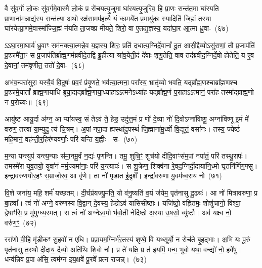 वै सु॑व॒र्गो लो॒कः सु॑व॒र्गमे॒वास्मै॑ लो॒कं प्र रो॑चयत्यृ॒जुमा घा॑रयत्यृ॒जुरि॑व॒ हि प्रा॒णः सन्त॑त॒मा घा॑रयति प्रा॒णाना॑म॒न्नाद्य॑स्य॒ सन्त॑त्या॒ अथो॒ रक्ष॑सा॒मप॑हत्यै॒ यं का॒मये॑त प्र॒मायु॑कः स्या॒दिति॑ जि॒ह्मं तस्या घा॑रयेत्प्रा॒णमे॒वास्मा᳚ज्जि॒ह्मं न॑यति ता॒जक्प्र मी॑यते॒ शिरो॒ वा ए॒तद्य॒ज्ञस्य॒ यदा॑घा॒र आ॒त्मा ध्रु॒वा-~(६७)\ip

ऽ\-ऽघा॒रमा॒घार्य॑ ध्रु॒वाꣳ सम॑नक्त्या॒त्मन्ने॒व य॒ज्ञस्य॒ शिरः॒ प्रति॑ दधा\-त्य॒\-ग्निर्दे॒वानां᳚ दू॒त आसी॒द्दैव्यो\-ऽसु॑राणां॒ तौ प्र॒जा\-प॑तिं प्र॒श्ञमै॑ता॒ꣳ॒ स प्र॒जा\-प॑तिर्ब्राह्म॒णम॑ब्रवीदे॒तद्वि ब्रू॒हीत्या श्रा॑व॒येती॒दं दे॑वाः शृणु॒तेति॒ वाव तद॑ब्रवीद॒ग्निर्दे॒वो होतेति॒ य ए॒व दे॒वानां॒ तम॑वृणीत॒ ततो॑ \mbox{दे॒वा-~(६८)\ip}

अभ॑व॒न्परा॑सुरा॒ यस्यै॒वं वि॒दुषः॑ प्रव॒रं प्र॑वृ॒णते॒ भव॑त्या॒त्मना॒ परा᳚स्य॒ भ्रातृ॑व्यो भवति॒ यद्ब्रा᳚ह्म॒णश्चाब्रा᳚ह्मणश्च प्र॒श्ञमे॒यातां᳚ ब्राह्म॒णायाधि॑ ब्रूया॒द्यद्ब्रा᳚ह्म॒णाया॒ध्याहा॒\-ऽऽ\-त्मने\-ऽध्या॑ह॒ यद्ब्रा᳚ह्म॒णं प॒राहा॒\-ऽऽ\-त्मानं॒ परा॑ह॒ तस्मा᳚द्ब्राह्म॒णो न प॒रोच्यः॑॥~(६९)\ip

{\anuvakamend[{वा आ॑र॒ण्याꣴश्चाव॑ रु॒न्धे\-ऽथो॑ प॒शुभिः॒ सो᳚\-ऽब्रवीद्दक्षिणा॒र्ध्य॑न्त्रय॑ इव ध्रु॒वा दे॒वाश्च॑त्वारि॒ꣳ॒शच्च॑}]}%

आयु॑ष्ट आयु॒र्दा अ॑ग्न॒ आ प्या॑यस्व॒ सं ते\-ऽव॑ ते॒ हेड॒ उदु॑त्त॒मं प्र णो॑ दे॒व्या नो॑ दि॒वो\-ऽग्ना॑विष्णू॒ अग्ना॑विष्णू इ॒मं मे॑ वरुण॒ तत्त्वा॑ या॒म्युदु॒ त्यं चि॒त्रम्। अ॒पां नपा॒दा ह्यस्था॑दु॒पस्थं॑ जि॒ह्माना॑मू॒र्ध्वो वि॒द्युतं॒ वसा॑नः। तस्य॒ ज्येष्ठं॑ महि॒मानं॒ वह॑न्ती॒र्॒\mbox{}हिर॑ण्यवर्णाः॒ परि॑ यन्ति य॒ह्वीः। स-~(७०)\ip

म॒न्या यन्त्युप॑ यन्त्य॒न्याः स॑मा॒नमू॒र्वं न॒द्यः॑ पृणन्ति। तमू॒ शुचि॒ꣳ॒ शुच॑यो दीदि॒वाꣳस॑म॒पां नपा॑तं॒ परि॑ तस्थु॒रापः॑। तमस्मे॑रा युव॒तयो॒ युवा॑नं मर्मृ॒ज्यमा॑नाः॒ परि॑ य॒न्त्यापः॑। स शु॒क्रेण॒ शिक्व॑ना रे॒वद॒ग्निर्दी॒दाया॑नि॒ध्मो घृ॒तनि॑र्णिग॒फ्सु। इन्द्रा॒वरु॑णयोर॒हꣳ स॒म्राजो॒रव॒ आ वृ॑णे। ता नो॑ मृडात ई॒दृशे᳚। इन्द्रा॑वरुणा यु॒वम॑ध्व॒राय॑ नो~(७१)\ip

वि॒शे जना॑य॒ महि॒ शर्म॑ यच्छतम्। दी॒र्घप्र॑यज्यु॒मति॒ यो व॑नु॒ष्यति॑ व॒यं ज॑येम॒ पृत॑नासु दू॒ढ्यः॑। आ नो॑ मित्रावरुणा॒ प्र बा॒हवा᳚। त्वं नो॑ अग्ने॒ वरु॑णस्य वि॒द्वान् दे॒वस्य॒ हेडो\-ऽव॑ यासिसीष्ठाः। यजि॑ष्ठो॒ वह्नि॑तमः॒ शोशु॑चानो॒ विश्वा॒ द्वेषाꣳ॑सि॒ प्र मु॑मुग्ध्य॒स्मत्। स त्वं नो॑ अग्ने\-ऽव॒मो भ॑वो॒ती नेदि॑ष्ठो अ॒स्या उ॒षसो॒ व्यु॑ष्टौ। अव॑ यक्ष्व नो॒ वरु॑ण॒ꣳ॒~(७२)\ip

ररा॑णो वी॒हि मृ॑डी॒कꣳ सु॒हवो॑ न एधि। प्रप्रा॒यम॒ग्निर्भ॑र॒तस्य॑ शृण्वे॒ वि यथ्सूर्यो॒ न रोच॑ते बृ॒हद्भाः। अ॒भि यः पू॒रुं पृत॑नासु त॒स्थौ दी॒दाय॒ दैव्यो॒ अति॑थिः शि॒वो नः॑। प्र ते॑ यक्षि॒ प्र त॑ इयर्मि॒ मन्म॒ भुवो॒ यथा॒ वन्द्यो॑ नो॒ हवे॑षु। धन्व॑न्निव प्र॒पा अ॑सि॒ त्वम॑ग्न इय॒क्षवे॑ पू॒रवे᳚ प्रत्न राजन्न्।~(७३)\ip

